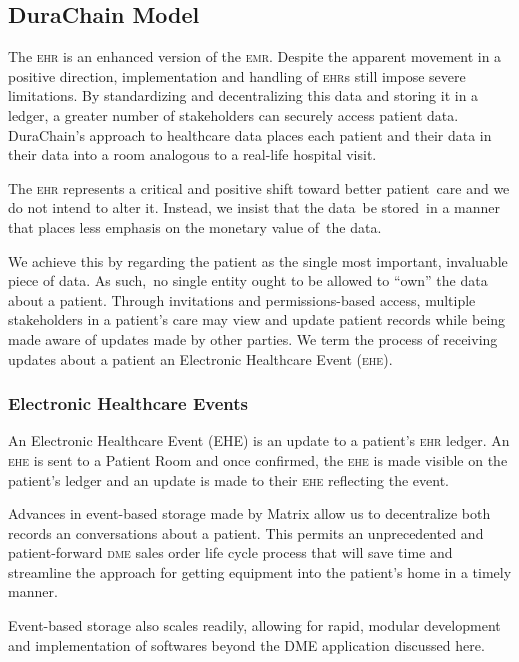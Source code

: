 \subsection{DuraChain Model}
The \textsc{ehr} is an enhanced version of the \textsc{emr}. Despite the apparent movement in a positive direction, implementation and handling of \textsc{ehr}s still impose severe limitations.\cite{palmaEHR} By standardizing and decentralizing this data and storing it in a ledger, a greater number of stakeholders can securely access patient data. DuraChain's approach to healthcare data places each patient and their data in their data into a room analogous to a real-life hospital visit.%

The \textsc{ehr} represents a critical and positive shift toward better patient care and we do not intend to alter it. Instead, we insist that the data be stored in a manner that places less emphasis on the monetary value of the data.%

We achieve this by regarding the patient as the single most important, invaluable piece of data. As such, no single entity ought to be allowed to ``own'' the data about a patient. Through invitations and permissions-based access, multiple stakeholders in a patient's care may view and update patient records while being made aware of updates made by other parties. We term the process of receiving updates about a patient an Electronic Healthcare Event (\textsc{ehe}).%

  \subsubsection{Electronic Healthcare Events}
  An Electronic Healthcare Event (\textsc{EHE}) is an update to a patient’s \textsc{ehr} ledger. An \textsc{ehe} is sent to a Patient Room and once confirmed, the \textsc{ehe} is made visible on the patient’s ledger and an update is made to their \textsc{ehe} reflecting the event.%

  Advances in event-based storage made by Matrix allow us to decentralize both records an conversations about a patient. This permits an unprecedented and patient-forward \textsc{dme} sales order life cycle process that will save time and streamline the approach for getting equipment into the patient's home in a timely manner.%

  Event-based storage also scales readily, allowing for rapid, modular development and implementation of softwares beyond the DME application discussed here.%

